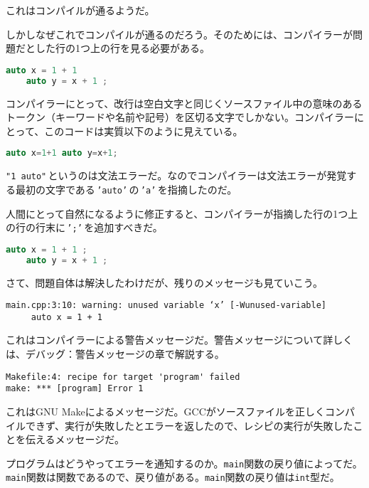 これはコンパイルが通るようだ。

しかしなぜこれでコンパイルが通るのだろう。そのためには、コンパイラーが問題だとした行の1つ上の行を見る必要がある。

\begin{lstlisting}[language=c++]
    auto x = 1 + 1
    auto y = x + 1 ;
\end{lstlisting}

コンパイラーにとって、改行は空白文字と同じくソースファイル中の意味のあるトークン（キーワードや名前や記号）を区切る文字でしかない。コンパイラーにとって、このコードは実質以下のように見えている。

\begin{lstlisting}[language=c++]
auto x=1+1 auto y=x+1;
\end{lstlisting}

\texttt{"1 auto"}\,というのは文法エラーだ。なのでコンパイラーは文法エラーが発覚する最初の文字である\,\texttt{'auto'}\,の\,\texttt{'a'}\,を指摘したのだ。

人間にとって自然になるように修正すると、コンパイラーが指摘した行の1つ上の行の行末に\,\texttt{';'}\,を追加すべきだ。

\begin{lstlisting}[language=c++]
    auto x = 1 + 1 ;
    auto y = x + 1 ;
\end{lstlisting}

さて、問題自体は解決したわけだが、残りのメッセージも見ていこう。

\begin{lstlisting}[style=terminal]
main.cpp:3:10: warning: unused variable ‘x’ [-Wunused-variable]
     auto x = 1 + 1
\end{lstlisting}

これはコンパイラーによる警告メッセージだ。警告メッセージについて詳しくは、デバッグ：警告メッセージの章で解説する。

\begin{lstlisting}[style=terminal]
Makefile:4: recipe for target 'program' failed
make: *** [program] Error 1
\end{lstlisting}

これはGNU Makeによるメッセージだ。GCCがソースファイルを正しくコンパイルできず、実行が失敗したとエラーを返したので、レシピの実行が失敗したことを伝えるメッセージだ。

プログラムはどうやってエラーを通知するのか。\texttt{main}関数の戻り値によってだ。\texttt{main}関数は関数であるので、戻り値がある。\texttt{main}関数の戻り値は\texttt{int}型だ。

